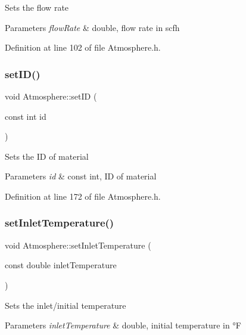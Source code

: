 Sets the flow rate 
\begin{DoxyParams}{Parameters}
{\em flow\+Rate} & double, flow rate in scfh \\
\hline
\end{DoxyParams}


Definition at line 102 of file Atmosphere.\+h.

\mbox{\label{class_atmosphere_a4698bf2580f7c24c8e0617d6455bfcac}} 
\subsubsection{\texorpdfstring{set\+I\+D()}{setID()}}
{\footnotesize\ttfamily void Atmosphere\+::set\+ID (\begin{DoxyParamCaption}\item[{const int}]{id }\end{DoxyParamCaption})\hspace{0.3cm}{\ttfamily [inline]}}

Sets the ID of material 
\begin{DoxyParams}{Parameters}
{\em id} & const int, ID of material \\
\hline
\end{DoxyParams}


Definition at line 172 of file Atmosphere.\+h.

\mbox{\label{class_atmosphere_a592bf7f82ea518fbd9da86d8f10cbc5c}} 
\subsubsection{\texorpdfstring{set\+Inlet\+Temperature()}{setInletTemperature()}}
{\footnotesize\ttfamily void Atmosphere\+::set\+Inlet\+Temperature (\begin{DoxyParamCaption}\item[{const double}]{inlet\+Temperature }\end{DoxyParamCaption})\hspace{0.3cm}{\ttfamily [inline]}}

Sets the inlet/initial temperature 
\begin{DoxyParams}{Parameters}
{\em inlet\+Temperature} & double, initial temperature in °F \\
\hline
\end{DoxyParams}


